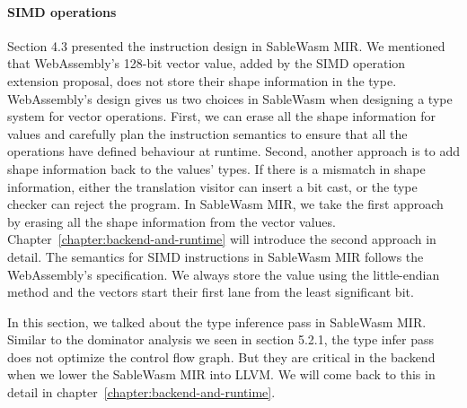 \paragraph{SIMD operations}
Section 4.3 presented the instruction design in SableWasm MIR. We mentioned
that WebAssembly's 128-bit vector value, added by the SIMD operation extension
proposal, does not store their shape information in the type. WebAssembly's
design gives us two choices in SableWasm when designing a type system for vector
operations. First, we can erase all the shape information for values and
carefully plan the instruction semantics to ensure that all the operations
have defined behaviour at runtime. Second, another approach is to add shape
information back to the values' types. If there is a mismatch in shape
information, either the translation visitor can insert a bit cast, or the type
checker can reject the program. In SableWasm MIR, we take the first approach by
erasing all the shape information from the vector values.
Chapter~\ref{chapter:backend-and-runtime} will introduce the second approach in
detail. The semantics for SIMD instructions in SableWasm MIR follows the
WebAssembly's specification. We always store the value using the little-endian
method and the vectors start their first lane from the least significant bit.

In this section, we talked about the type inference pass in SableWasm MIR.
Similar to the dominator analysis we seen in section 5.2.1, the type infer pass
does not optimize the control flow graph. But they are critical in the backend
when we lower the SableWasm MIR into LLVM. We will come back to this in detail
in chapter~\ref{chapter:backend-and-runtime}.